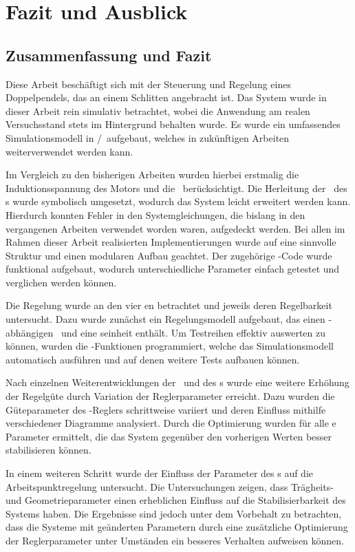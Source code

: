 \chapter{Fazit und Ausblick}

\section{Zusammenfassung und Fazit}

Diese Arbeit beschäftigt sich mit der Steuerung und Regelung eines Doppelpendels, das an einem Schlitten angebracht ist.
Das System wurde in dieser Arbeit rein simulativ betrachtet, wobei die Anwendung am realen Versuchsstand stets im Hintergrund behalten wurde.
Es wurde ein umfassendes Simulationsmodell in \ml/\sm\ aufgebaut, welches in zukünftigen Arbeiten weiterverwendet werden kann. 

Im Vergleich zu den bisherigen Arbeiten wurden hierbei erstmalig die Induktionsspannung des Motors und die \crb\ berücksichtigt.
Die Herleitung der \bwgl\ des \spds s wurde symbolisch umgesetzt, wodurch das System leicht erweitert werden kann.
Hierdurch konnten Fehler in den Systemgleichungen, die bislang in den vergangenen Arbeiten verwendet worden waren, aufgedeckt werden.
Bei allen im Rahmen dieser Arbeit realisierten Implementierungen wurde auf eine sinnvolle Struktur und einen modularen Aufbau geachtet.
Der zugehörige \ml-Code wurde funktional aufgebaut, wodurch unterschiedliche Parameter einfach getestet und verglichen werden können.

Die Regelung wurde an den vier \ap en betrachtet und jeweils deren Regelbarkeit untersucht.
Dazu wurde zunächst ein Regelungsmodell aufgebaut, das einen \ap-abhängigen \zsr\ und eine \vorst seinheit enthält.
Um Testreihen effektiv auswerten zu können, wurden die \xots-Funktionen programmiert, welche das Simulationsmodell automatisch ausführen und auf denen weitere Tests aufbauen können.

Nach einzelnen Weiterentwicklungen der \vorst\ und des \beob s wurde eine weitere Erhöhung der Regelgüte durch Variation der Reglerparameter erreicht.
Dazu wurden die Güteparameter des \ricc-Reglers schrittweise variiert und deren Einfluss mithilfe verschiedener Diagramme analysiert.
Durch die Optimierung wurden für alle \ap e Parameter ermittelt, die das System gegenüber den vorherigen Werten besser stabilisieren können.

In einem weiteren Schritt wurde der Einfluss der Parameter des \dpd s auf die Arbeitspunktregelung untersucht.
Die Untersuchungen zeigen, dass Trägheits- und Geometrieparameter einen erheblichen Einfluss auf die Stabilisierbarkeit des Systems haben.
Die Ergebnisse sind jedoch unter dem Vorbehalt zu betrachten, dass die Systeme mit geänderten Parametern durch eine zusätzliche Optimierung der Reglerparameter unter Umständen ein besseres Verhalten aufweisen können. 


